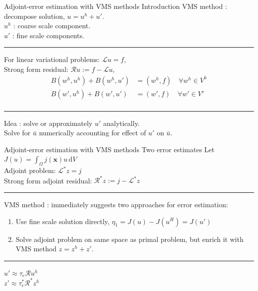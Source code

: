 \documentclass[fleqn]{beamer}
\newcommand{\bs}[1]{\boldsymbol{#1}}
\begin{document}
\begin{frame}{Adjoint-error estimation with VMS methods}
{Introduction}
VMS method : decompose solution, $u = u^h + u'$. \\
$u^h$ : coarse scale component. \\
$u'$ : fine scale components. \\ [8pt]
\hrule
\vspace{1em}
For linear variational problems: $\mathcal{L} u  = f$, \\
Strong form residual: $\mathcal{R} u := f - \mathcal{L} u$,
%
\begin{equation*}
\begin{aligned}
B(w^h, u^h) + B(w^h, u') &= (w^h, f) \quad \forall w^h \in V^h \\
B(w', u^h) + B(w', u') &= (w', f) \quad \forall w' \in V' \\
\end{aligned}
\end{equation*}
\hrule
\vspace{1em}
Idea : solve or approximately $u'$ analytically. \\
Solve for $\bar{u}$ numerically accounting for effect of $u'$
on $\bar{u}.$
\end{frame}


\begin{frame}{Adjoint-error estimation with VMS methods}
{Two error estimates}
Let $J(u) = \int_{\Omega} j(\bs{x}) u \, \text{d} V$ \\
Adjoint problem: $\mathcal{L}^* z = j$ \\
Strong form adjoint residual: $\mathcal{R}^*z := j - \mathcal{L}^*z$ \\ [8pt]
\hrule
\vspace{1em}
VMS method : immediately suggests two approaches for error estimation:
\begin{enumerate}
\item Use fine scale solution directly, $\eta_1 = J(u) - J(u^H) = J(u')$
\item Solve adjoint problem on same space as primal problem,
but enrich it with VMS method $z = z^h + z'$.
\end{enumerate}
\vspace{0.5em}
\hrule
\vspace{1em}
$u' \approx \tau_e \mathcal{R} u^h$ \\
$z' \approx \tau^*_e \mathcal{R}^* z^h$ \\
\end{frame}
\end{document}
